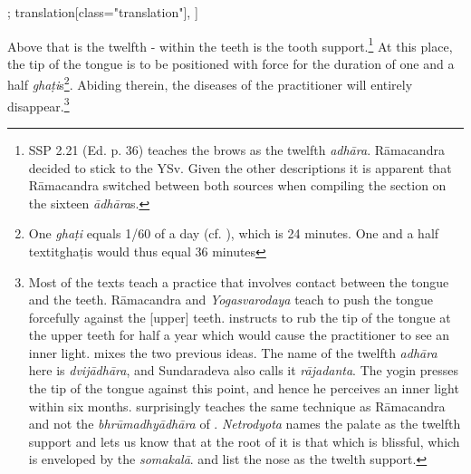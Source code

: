 \begin{alignment}[
  texts=edition[class="edition"];
  translation[class="translation"],
  ]
\begin{translation}
\begin{tlate}[p30_04]
      Above that is the twelfth - within the teeth is the tooth support.\footnote{SSP 2.21 (Ed. p. 36) teaches the brows as the twelfth \textit{adhāra}. Rāmacandra decided to stick to the YSv. Given the other descriptions it is apparent that Rāmacandra switched between both sources when compiling the section on the sixteen \textit{ādhāra}s.} At this place, the tip of the tongue is to be positioned with force for the duration of one and a half \textit{ghaṭi}s\footnote{One \textit{ghaṭi} equals 1/60 of a day (cf. \citeauthor[1966: 114]{sircar1966}), which is 24 minutes. One and a half textit{ghaṭi}s would thus equal 36 minutes}. Abiding therein, the diseases of the practitioner will entirely disappear.\footnote{Most of the texts teach a practice that involves contact between the tongue and the teeth. Rāmacandra and \textit{Yogasvarodaya} teach to push the tongue forcefully against the [upper] teeth.  instructs to rub the tip of the tongue at the upper teeth for half a year which would cause the practitioner to see an inner light.  mixes the two previous ideas. The name of the twelfth \textit{adhāra} here is \textit{dvijādhāra}, and Sundaradeva also calls it \textit{rājadanta}. The yogin presses the tip of the tongue against this point, and hence he perceives an inner light within six months.  surprisingly teaches the same technique as Rāmacandra and not the \textit{bhrūmadhyādhāra} of . \textit{Netrodyota} names the palate as the twelfth support and lets us know that at the root of it is that which is blissful, which is enveloped by the \textit{somakalā}.  and  list the nose as the twelth support.}    
\flushpage 
      \end{tlate}
  \end{translation}
\end{alignment}
\pagebreak %

